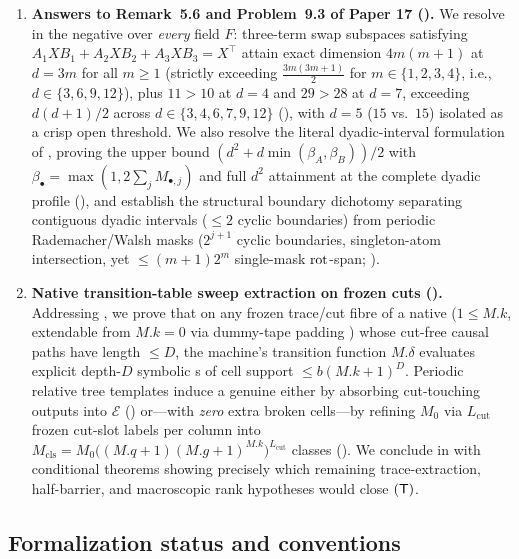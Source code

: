 \begin{enumerate}[label=\arabic*.]
\item \textbf{Answers to Remark~5.6 and Problem~9.3 of Paper 17 ().}
  We resolve \cite[Remark~5.6]{SeventeenthPaper2026} in the negative over \emph{every} field $F$:
  three-term swap subspaces satisfying $A_1 X B_1 + A_2 X B_2 + A_3 X B_3 = X^\top$ attain exact
  dimension $4m(m+1)$ at $d = 3m$ for all $m \ge 1$ (strictly exceeding $\frac{3m(3m+1)}{2}$ for
  $m \in \{1,2,3,4\}$, i.e., $d \in \{3,6,9,12\}$), plus $11 > 10$ at $d = 4$ and $29 > 28$ at
  $d = 7$, exceeding $d(d+1)/2$ across $d \in \{3,4,6,7,9,12\}$ (),
  with $d = 5$ ($15$ vs.\ $15$) isolated as a crisp open threshold. We also resolve the literal
  dyadic-interval formulation of \cite[Problem~9.3]{SeventeenthPaper2026}, proving the upper bound
  $(d^2 + d\min(\beta_A,\beta_B))/2$ with $\beta_\bullet = \max(1, 2\sum_j M_{\bullet,j})$ and full
  $d^2$ attainment at the complete dyadic profile (), and establish
  the structural boundary dichotomy separating contiguous dyadic intervals ($\le 2$ cyclic
  boundaries) from periodic Rademacher/Walsh masks ($2^{j+1}$ cyclic boundaries, singleton-atom
  intersection, yet $\le (m+1)2^m$ single-mask $\operatorname{rot}$-span; ).

\item \textbf{Native transition-table sweep extraction on frozen cuts ().}
  Addressing \cite[Problem~9.4]{SeventeenthPaper2026}, we prove that on any frozen trace/cut fibre
  of a native  ($1 \le M.k$, extendable from $M.k = 0$ via dummy-tape
  padding ) whose cut-free causal paths have length $\le D$, the machine's
  transition function $M.\delta$ evaluates explicit depth-$D$ symbolic s of
  cell support $\le b(M.k+1)^D$. Periodic relative tree templates induce a genuine
   either by absorbing cut-touching outputs into $\mathcal{E}$
  () or---with \emph{zero} extra broken cells---by refining $M_0$ via
  $L_{\mathrm{cut}}$ frozen cut-slot labels per column into
  $M_{\mathrm{cls}} = M_0 \bigl((M.q+1)(M.g+1)^{M.k}\bigr)^{L_{\mathrm{cut}}}$ classes
  (). We conclude in  with conditional theorems
  showing precisely which remaining trace-extraction, half-barrier, and macroscopic rank hypotheses
  would close $(\mathsf{T})$.
\end{enumerate}

\subsection{Formalization status and conventions}\label{sec:conventions}

